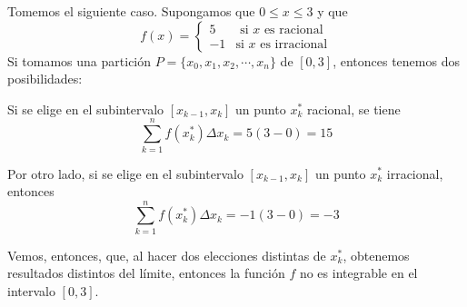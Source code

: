 \begin{ejemplo}
Tomemos el siguiente caso. Supongamos que $0\leq x\leq 3$ y que
\[
f(x)=
\begin{cases}
  5 & \text{ si $x$ es racional}\\
  -1 & \text{si $x$ es irracional}
\end{cases}
\]
Si tomamos una partición $P=\{x_{0},x_{1},x_{2},\cdots ,x_{n}\}$ de $[0,3]$, entonces tenemos dos posibilidades:

\begin{parrafoitemize}
\item Si se elige en el subintervalo $\left[ x_{k-1},x_{k}\right] $ un punto $x_{k}^{\ast }$ racional, se tiene
\[
  \sum_{k=1}^{n}f(x_{k}^{\ast })\Delta x_{k}=5\left(
  3-0\right) =15
\]

\item Por otro lado, si se elige en el subintervalo $\left[x_{k-1},x_{k}\right]$ un punto $x_{k}^{\ast }$ irracional, entonces
\[
  \sum_{k=1}^{n}f(x_{k}^{\ast })\Delta x_{k}=-1\left(
  3-0\right)=-3
\]
\end{parrafoitemize}
Vemos, entonces, que, al hacer dos elecciones distintas de $x_k^*$, obtenemos resultados distintos del límite, entonces la función $f$ no es integrable en el intervalo $[0,3].$
\end{ejemplo}

